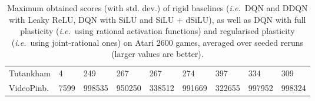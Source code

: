 \documentclass[accepted]{article}
\theoremstyle{plain}
\theoremstyle{definition}
\theoremstyle{remark}
\newcommand{\ie}{\emph{i.e.}~}
\begin{document}
\begin{table}[H]
{\begin{tabular}{@{}lllllllll@{}}
\multicolumn{1}{l|}{Tutankham}  & \multicolumn{1}{l|}{4}      & 249                       & 267                      & \multicolumn{1}{l|}{267}    & \multicolumn{1}{l|}{274}    & 397                      & 334                      & 309                             \\
\multicolumn{1}{l|}{VideoPinb.} & \multicolumn{1}{l|}{7599}   & 998535                    & 950250                   & \multicolumn{1}{l|}{338512} & \multicolumn{1}{l|}{991669} & 322655                   & 997952                   & 998324                          \\ \bottomrule
\end{tabular}
}
\caption{Maximum obtained scores (with std. dev.) of rigid baselines (\ie DQN and DDQN with Leaky ReLU, DQN with SiLU and SiLU + dSiLU), as well as DQN with full plasticity (\ie using rational activation functions) and regularised plasticity (\ie using joint-rational ones) on Atari 2600 games, averaged over  seeded reruns (larger values are better).}
\end{table}
\end{document}
